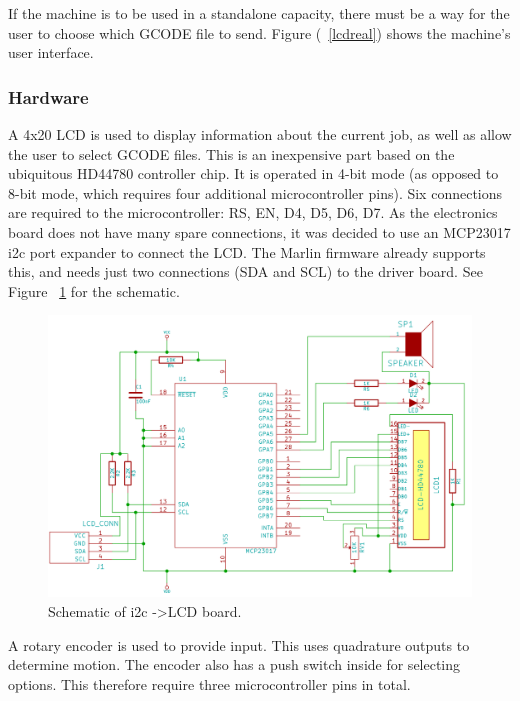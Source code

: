 If the machine is to be used in a standalone capacity, there must be a way for the user to choose which GCODE file to send.
Figure (~\ref{lcdreal}) shows the machine's user interface.

\subsubsection{Hardware}
A 4x20 LCD is used to display information about the current job, as well as allow the user to select GCODE files. This is an inexpensive part based on the ubiquitous HD44780 controller chip.
It is operated in 4-bit mode (as opposed to 8-bit mode, which requires four additional microcontroller pins). Six connections are required to the microcontroller: RS, EN, D4, D5, D6, D7. As
the electronics board does not have many spare connections, it was decided to use an MCP23017 i2c port expander to connect the LCD. The Marlin firmware already supports this, and needs just
two connections (SDA and SCL) to the driver board. See Figure ~\ref{lcd_backpack} for the schematic.

\begin{figure}[ht!]
\centering
\includegraphics[width=160mm]{resources/lcd_backpack.png}
\caption{Schematic of i2c -\textgreater LCD board.}
\label{lcd_backpack}
\end{figure}

A rotary encoder is used to provide input. This uses quadrature outputs to determine motion. The encoder also has a push switch inside for selecting options. This therefore require three microcontroller
pins in total.










